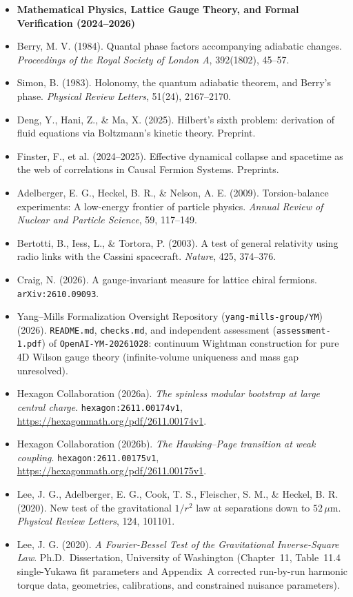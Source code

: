\begin{itemize}
\item[] \textbf{Mathematical Physics, Lattice Gauge Theory, and Formal Verification (2024--2026)}
\item Berry, M. V. (1984). Quantal phase factors accompanying adiabatic changes. \emph{Proceedings of the Royal Society of London A}, 392(1802), 45--57.
\item Simon, B. (1983). Holonomy, the quantum adiabatic theorem, and Berry's phase. \emph{Physical Review Letters}, 51(24), 2167--2170.
\item Deng, Y., Hani, Z., \& Ma, X. (2025). Hilbert's sixth problem: derivation of fluid equations via Boltzmann's kinetic theory. Preprint.
\item Finster, F., et al. (2024--2025). Effective dynamical collapse and spacetime as the web of correlations in Causal Fermion Systems. Preprints.
\item Adelberger, E. G., Heckel, B. R., \& Nelson, A. E. (2009). Torsion-balance experiments: A low-energy frontier of particle physics. \emph{Annual Review of Nuclear and Particle Science}, 59, 117--149.
\item Bertotti, B., Iess, L., \& Tortora, P. (2003). A test of general relativity using radio links with the Cassini spacecraft. \emph{Nature}, 425, 374--376.
\item Craig, N. (2026). A gauge-invariant measure for lattice chiral fermions. \texttt{arXiv:2610.09093}.
\item Yang--Mills Formalization Oversight Repository (\texttt{yang-mills-group/YM}) (2026). \texttt{README.md}, \texttt{checks.md}, and independent assessment (\texttt{assessment-1.pdf}) of \texttt{OpenAI-YM-20261028}: continuum Wightman construction for pure 4D Wilson gauge theory (infinite-volume uniqueness and mass gap unresolved).
\item Hexagon Collaboration (2026a). \emph{The spinless modular bootstrap at large central charge}. \texttt{hexagon:2611.00174v1}, \url{https://hexagonmath.org/pdf/2611.00174v1}.
\item Hexagon Collaboration (2026b). \emph{The Hawking--Page transition at weak coupling}. \texttt{hexagon:2611.00175v1}, \url{https://hexagonmath.org/pdf/2611.00175v1}.
\item Lee, J. G., Adelberger, E. G., Cook, T. S., Fleischer, S. M., \& Heckel, B. R. (2020). New test of the gravitational $1/r^2$ law at separations down to $52\,\mu\mathrm{m}$. \emph{Physical Review Letters}, 124, 101101.
\item Lee, J. G. (2020). \emph{A Fourier-Bessel Test of the Gravitational Inverse-Square Law}. Ph.D.\ Dissertation, University of Washington (Chapter~11, Table~11.4 single-Yukawa fit parameters and Appendix~A corrected run-by-run harmonic torque data, geometries, calibrations, and constrained nuisance parameters).

\end{itemize}
